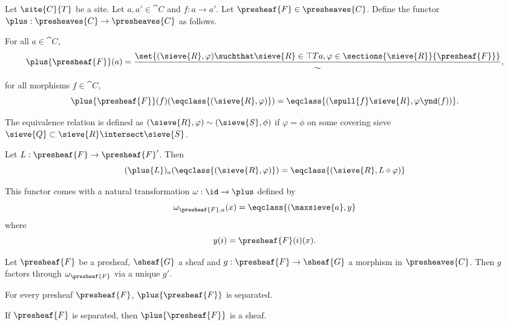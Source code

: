 \begin{definition}
Let $\site{C}{T}$ be a site.
Let $a, a' \in \cat{C}$ and $f:a \rightarrow a'$. 
Let $\presheaf{F} \in \presheaves{C}$.
Define the functor $\plus: \presheaves{C} \rightarrow \presheaves{C}$ as follows.

For all $a\in \cat{C}$,
\[\plus{\presheaf{F}}(a) = \frac{\set{(\sieve{R},\varphi) 
	\suchthat \sieve{R} \in \top{T}{a},
	\varphi \in \sections{\sieve{R}}{\presheaf{F}}}}
	{\sim},
\]

for all morphisms $f \in \cat{C}$,
\[ \plus{\presheaf{F}}(f)(\eqclass{(\sieve{R},\varphi)}) 
	= \eqclass{(\spull{f}\sieve{R}, \varphi\ynd(f) )}.
\]

The equivalence relation is defined as
$(\sieve{R},\varphi) \sim (\sieve{S},\phi)$
if $\varphi = \phi$ on some covering sieve $\sieve{Q} \subset \sieve{R} \intersect \sieve{S}$.

Let $L: \presheaf{F} \rightarrow \presheaf{F}'$.
Then 
\[ (\plus{L})_a (\eqclass{(\sieve{R}, \varphi)})
	= \eqclass{(\sieve{R}, L \circ \varphi)}
\]

This functor comes with a natural transformation $\omega: \id \rightarrow \plus$
defined by
\[\omega_{\presheaf{F},a}(x) = \eqclass{(\maxsieve{a}, y}\]
where
\[y(i) = \presheaf{F}(i)(x).\]
\end{definition}


\begin{lemma}
Let $\presheaf{F}$ be a presheaf, $\sheaf{G}$ a sheaf and $g:\presheaf{F} \rightarrow \sheaf{G}$ a morphism in $\presheaves{C}$.
Then $g$ factors through $\omega_{\presheaf{F}}$ via a unique $g'$.
\end{lemma}

\begin{lemma}
For every presheaf $\presheaf{F}$, $\plus{\presheaf{F}}$ is separated.
\end{lemma}

\begin{lemma}
If $\presheaf{F}$ is separated, then $\plus{\presheaf{F}}$ is a sheaf.
\end{lemma}